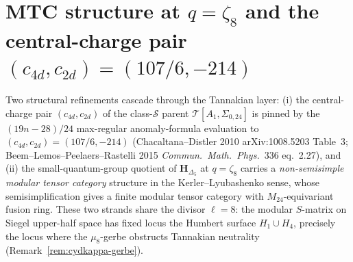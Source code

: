 \section{MTC structure at \texorpdfstring{$q=\zeta_8$}{q=zeta-8} and the central-charge pair \texorpdfstring{$(c_{4d},c_{2d}) = (107/6, -214)$}{(c-4d,c-2d) = (107/6, -214)}}
\label{sec:cydkappa-mtc-fusion}

Two structural refinements cascade through the Tannakian
layer: (i) the central-charge pair $(c_{4d},c_{2d})$ of the
class-$\mathcal S$ parent $\mathcal T[A_1,\Sigma_{0,24}]$ is pinned by
the $(19n-28)/24$ max-regular anomaly-formula evaluation to
$(c_{4d},c_{2d}) = (107/6,-214)$ (Chacaltana--Distler 2010
arXiv:1008.5203 Table~3; Beem--Lemos--Peelaers--Rastelli 2015
\emph{Commun.~Math.~Phys.}~336 eq.~2.27),
and (ii) the small-quantum-group quotient of $\mathbf H_{\Delta_5}$ at
$q=\zeta_8$ carries a \emph{non-semisimple modular tensor category}
structure in the Kerler--Lyubashenko sense, whose semisimplification
gives a finite modular tensor category with $M_{24}$-equivariant fusion
ring. These two strands share the divisor $\ell=8$: the modular
$S$-matrix on Siegel upper-half space has fixed locus the Humbert
surface $H_1\cup H_4$, precisely the locus where the
$\mu_8$-gerbe obstructs Tannakian neutrality
(Remark~\ref{rem:cydkappa-gerbe}).

